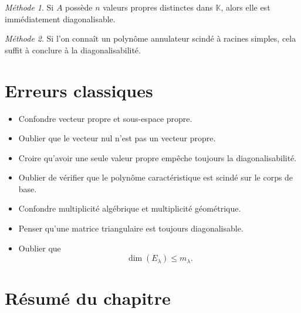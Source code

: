 \documentclass[11pt,a4paper]{article}
\theoremstyle{remark}
\newtheorem*{methode}{Méthode}
\newcommand{\K}{\mathbb{K}}
\begin{document}
\begin{methode}
Si \(A\) possède \(n\) valeurs propres distinctes dans \(\K\), alors elle est immédiatement diagonalisable.
\end{methode}

\begin{methode}
Si l’on connaît un polynôme annulateur scindé à racines simples, cela suffit à conclure à la diagonalisabilité.
\end{methode}

\section{Erreurs classiques}

\begin{itemize}
    \item Confondre vecteur propre et sous-espace propre.
    \item Oublier que le vecteur nul n’est pas un vecteur propre.
    \item Croire qu’avoir une seule valeur propre empêche toujours la diagonalisabilité.
    \item Oublier de vérifier que le polynôme caractéristique est scindé sur le corps de base.
    \item Confondre multiplicité algébrique et multiplicité géométrique.
    \item Penser qu’une matrice triangulaire est toujours diagonalisable.
    \item Oublier que
    \[
    \dim(E_\lambda)\le m_\lambda.
    \]
\end{itemize}

\section{Résumé du chapitre}
\end{document}
